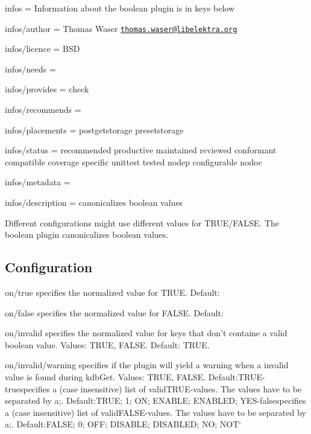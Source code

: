 
\begin{DoxyItemize}
\item infos = Information about the boolean plugin is in keys below
\item infos/author = Thomas Waser \href{mailto:thomas.waser@libelektra.org}{\tt thomas.\+waser@libelektra.\+org}
\item infos/licence = B\+S\+D
\item infos/needs =
\item infos/provides = check
\item infos/recommends =
\item infos/placements = postgetstorage presetstorage
\item infos/status = recommended productive maintained reviewed conformant compatible coverage specific unittest tested nodep configurable nodoc
\item infos/metadata =
\item infos/description = canonicalizes boolean values
\end{DoxyItemize}

Different configurations might use different values for {\ttfamily T\+R\+U\+E}/{\ttfamily F\+A\+L\+S\+E}. The {\ttfamily boolean} plugin canonicalizes boolean values.

\subsection*{Configuration}


\begin{DoxyItemize}
\item {\ttfamily on/true} specifies the normalized value for {\ttfamily T\+R\+U\+E}. Default\+: {}
\item {\ttfamily on/false} specifies the normalized value for {\ttfamily F\+A\+L\+S\+E}. Default\+: {}
\item {\ttfamily on/invalid} specifies the normalized value for keys that don't containe a valid boolean value. Values\+: {\ttfamily T\+R\+U\+E}, {\ttfamily F\+A\+L\+S\+E}. Default\+: {\ttfamily T\+R\+U\+E}.
\item {\ttfamily on/invalid/warning} specifies if the plugin will yield a warning when a invalid value is found during kdb\+Get. Values\+: {\ttfamily T\+R\+U\+E}, {\ttfamily F\+A\+L\+S\+E}. {\ttfamily Default\+:}T\+R\+U\+E{\ttfamily  -\/}true{\ttfamily specifies a (case insensitive) list of valid}T\+R\+U\+E{\ttfamily -\/values. The values have to be separated by a};{\ttfamily . Default\+:}T\+R\+U\+E; 1; O\+N; E\+N\+A\+B\+L\+E; E\+N\+A\+B\+L\+E\+D; Y\+E\+S{\ttfamily  -\/}false{\ttfamily specifies a (case insensitive) list of valid}F\+A\+L\+S\+E{\ttfamily -\/values. The values have to be separated by a};{\ttfamily . Default\+:}F\+A\+L\+S\+E; 0; O\+F\+F; D\+I\+S\+A\+B\+L\+E; D\+I\+S\+A\+B\+L\+E\+D; N\+O; N\+O\+T` 
\end{DoxyItemize}